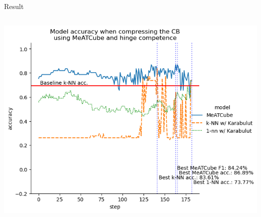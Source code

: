 \documentclass[]{beamer}
\begin{document}
\begin{frame}{Result}
\begin{columns}
\begin{column}{.65\textwidth}
            \includegraphics[width=.8\textwidth]{../results-weight-estim+/figs/haberman+s+survival.png}
        \end{column}
    \end{columns}
\end{frame}
\end{document}
